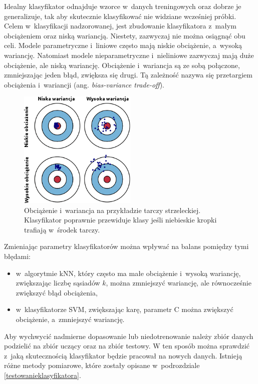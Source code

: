 Idealny klasyfikator odnajduje wzorce w~danych treningowych oraz dobrze je generalizuje, tak aby skutecznie klasyfikować nie widziane wcześniej próbki. Celem w~klasyfikacji nadzorowanej, jest zbudowanie klasyfikatora z~małym obciążeniem oraz niską wariancją. Niestety, zazwyczaj nie można osiągnąć obu celi. Modele parametryczne i~liniowe często mają niskie obciążenie, a~wysoką wariancję. Natomiast modele nieparametryczne i~nieliniowe zazwyczaj mają duże obciążenie, ale niską wariancję. Obciążenie i~wariancja są ze sobą połączone, zmniejszając jeden błąd, zwiększa się drugi. Tą zależność nazywa się przetargiem obciążenia i~wariancji (ang. \textit{bias-variance trade-off}).
\begin{figure}[H]
	\centering
	\includegraphics[width=0.5\textwidth]{./images/biasvariance.png}
	\caption[Rysunek wariancji i~obciążenia]{Obciążenie i~wariancja na przykładzie tarczy strzeleckiej. Klasyfikator poprawnie przewiduje klasy jeśli niebieskie kropki trafiają w~środek tarczy.}
	\label{fig:biasvariance}
\end{figure}
Zmieniając parametry klasyfikatorów można wpływać na balans pomiędzy tymi błędami:
\begin{itemize}
	\item w~algorytmie kNN, który często ma małe obciążenie i~wysoką wariancję, zwiększając liczbę sąsiadów $k$, można zmniejszyć wariancję, ale równocześnie zwiększyć błąd obciążenia,
	\item w~klasyfikatorze SVM, zwiększając karę, parametr C można zwiększyć obciążenie, a~zmniejszyć wariancję.
\end{itemize}
Aby wychwycić nadmierne dopasowanie lub niedotrenowanie należy zbiór danych podzielić na zbiór uczący oraz na zbiór testowy. W ten sposób można sprawdzić z~jaką skutecznością klasyfikator będzie pracował na nowych danych. Istnieją różne metody pomiarowe, które zostały opisane w~podrozdziale \ref{testowanieklasyfikatora}.


